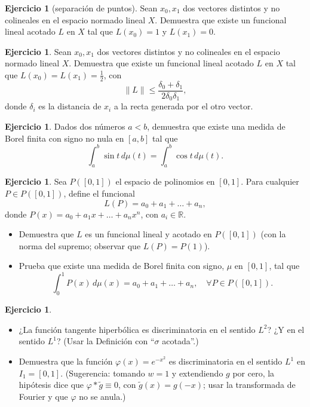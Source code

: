 \documentclass[12pt, a4paper]{amsbook}
\newcommand{\R}{{\mathbb R}}
\theoremstyle{remark}
\theoremstyle{definition}
\newtheorem{ejer}[teo]{Ejercicio}
\numberwithin{section}{chapter}
\numberwithin{subsection}{section}
\numberwithin{equation}{section}
\numberwithin{figure}{chapter}
\begin{document}
\begin{ejer}[separación de puntos] 
Sean $x_0, x_1$ dos vectores distintos y no colineales en el espacio normado lineal $X$. Demuestra que existe un funcional lineal acotado $L$ en $X$ tal que $L(x_0) = 1$ y $L(x_1) = 0$.
\end{ejer}

\begin{ejer}
Sean $x_0, x_1$ dos vectores distintos y no colineales en el espacio normado lineal $X$. Demuestra que existe un funcional lineal acotado $L$ en $X$ tal que $L(x_0) = L(x_1) = \frac{1}{2}$, con
$$
\|L\| \leq \frac{\delta_0 + \delta_1}{2 \delta_0 \delta_1},
$$
donde $\delta_i$ es la distancia de $x_i$ a la recta generada por el otro vector.
\end{ejer}

\begin{ejer}
Dados dos números $a<b$, demuestra que existe una medida de Borel finita con signo no nula en $[a, b]$ tal que
$$
\int_a^b \sin t \, d\mu(t) = \int_a^b \cos t \, d\mu(t).
$$
\end{ejer}

\begin{ejer}
Sea $P([0,1])$ el espacio de polinomios en $[0,1]$. Para cualquier $P \in P([0,1])$, define el funcional
$$
L(P) = a_0 + a_1 + \dots + a_n,
$$
donde $P(x) = a_0 + a_1x + \dots + a_n x^n$, con $a_i \in \R$.
\begin{itemize}
\item[(a)] Demuestra que $L$ es un funcional lineal y acotado en $P([0,1])$ (con la norma del supremo; observar que $L(P)=P(1)$).
\item[(b)] Prueba que existe una medida de Borel finita con signo, $\mu$ en $[0,1]$, tal que
$$
\int_0^1 P(x) \, d\mu(x) = a_0 + a_1 + \dots + a_n, \quad \forall P \in P([0,1]).
$$
\end{itemize}
\end{ejer}

\begin{ejer}
\begin{itemize}
\item[(a)] ¿La función tangente hiperbólica es discriminatoria en el sentido $L^2$? ¿Y en el sentido $L^1$? (Usar la Definición con ``$\sigma$ acotada''.)
\item[(b)] Demuestra que la función $\varphi(x) = e^{-x^2}$ es discriminatoria en el sentido $L^1$ en $I_1=[0,1]$. (Sugerencia: tomando $w=1$ y extendiendo $g$ por cero, la hipótesis dice que $\varphi*\tilde g\equiv0$, con $\tilde g(x)=g(-x)$; usar la transformada de Fourier y que $\hat\varphi$ no se anula.)
\end{itemize}
\end{ejer}
\end{document}
